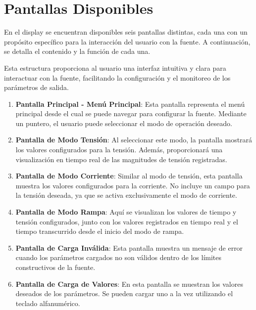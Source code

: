 \section{Pantallas Disponibles} 
En el display se encuentran disponibles seis pantallas distintas, cada una con un propósito específico para la interacción del usuario con la fuente. A continuación, se detalla el contenido y la función de cada una. \par 
Esta estructura proporciona al usuario una interfaz intuitiva y clara para interactuar con la fuente, facilitando la configuración y el monitoreo de los parámetros de salida.\par 
\begin{enumerate}
    \item \textbf{Pantalla Principal - Menú Principal}: Esta pantalla representa el menú principal desde el cual se puede navegar para configurar la fuente. Mediante un puntero, el usuario puede seleccionar el modo de operación deseado.
    \item \textbf{Pantalla de Modo Tensión}: Al seleccionar este modo, la pantalla mostrará los valores configurados para la tensión. Además, proporcionará una visualización en tiempo real de las magnitudes de tensión registradas.
    \item \textbf{Pantalla de Modo Corriente}: Similar al modo de tensión, esta pantalla muestra los valores configurados para la corriente. No incluye un campo para la tensión deseada, ya que se activa exclusivamente el modo de corriente.
    \item \textbf{Pantalla de Modo Rampa}: Aquí se visualizan los valores de tiempo y tensión configurados, junto con los valores registrados en tiempo real y el tiempo transcurrido desde el inicio del modo de rampa.
    \item \textbf{Pantalla de Carga Inválida}: Esta pantalla muestra un mensaje de error cuando los parámetros cargados no son válidos dentro de los límites constructivos de la fuente.
    \item \textbf{Pantalla de Carga de Valores}: En esta pantalla se muestran los valores deseados de los parámetros. Se pueden cargar uno a la vez utilizando el teclado alfanumérico.
\end{enumerate}













